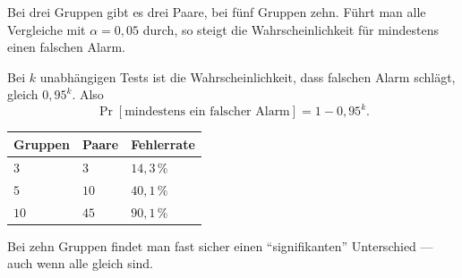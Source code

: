 \begin{warnung}
Bei drei Gruppen gibt es drei Paare, bei fünf Gruppen zehn. Führt man alle Vergleiche mit $\alpha = 0{,}05$ durch, so steigt die Wahrscheinlichkeit für mindestens einen falschen Alarm.

Bei $k$ unabhängigen Tests ist die Wahrscheinlichkeit, dass  falschen Alarm schlägt, gleich $0{,}95^k$. Also
\[ \Pr[\text{mindestens ein falscher Alarm}] = 1 - 0{,}95^k . \]

\begin{center}
\renewcommand{\arraystretch}{1.45}
\begin{tabular}{@{}P{2.0cm}P{1.8cm}P{2.6cm}@{}}
\toprule
\textbf{Gruppen} & \textbf{Paare} & \textbf{Fehlerrate}\\
\midrule
$3$ & $3$ & $14{,}3\,\%$\\
$5$ & $10$ & $40{,}1\,\%$\\
$10$ & $45$ & \textcolor{akzent}{$90{,}1\,\%$}\\
\bottomrule
\end{tabular}
\end{center}

Bei zehn Gruppen findet man fast sicher einen \enquote{signifikanten} Unterschied --- auch wenn alle gleich sind.

\begin{center}
\begin{minipage}{0.88\textwidth}
\end{minipage}
\end{center}
\end{warnung}

